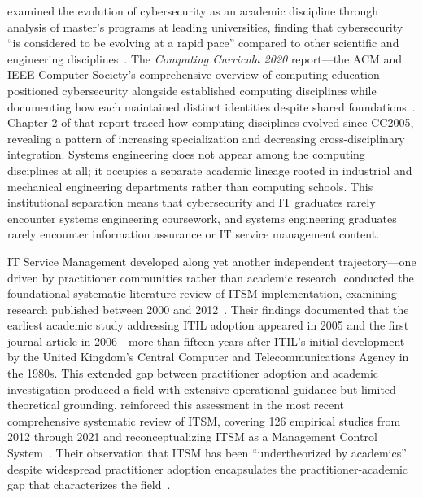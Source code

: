 \citeauthor{Cabaj_2018} examined the evolution of cybersecurity as an academic discipline through analysis of master's programs at leading universities, finding that cybersecurity ``is considered to be evolving at a rapid pace'' compared to other scientific and engineering disciplines~\parencite{Cabaj_2018}. The \textit{Computing Curricula 2020} report---the ACM and IEEE Computer Society's comprehensive overview of computing education---positioned cybersecurity alongside established computing disciplines while documenting how each maintained distinct identities despite shared foundations~\parencite{CC2020}. Chapter 2 of that report traced how computing disciplines evolved since CC2005, revealing a pattern of increasing specialization and decreasing cross-disciplinary integration. Systems engineering does not appear among the computing disciplines at all; it occupies a separate academic lineage rooted in industrial and mechanical engineering departments rather than computing schools. This institutional separation means that cybersecurity and IT graduates rarely encounter systems engineering coursework, and systems engineering graduates rarely encounter information assurance or IT service management content.

IT Service Management developed along yet another independent trajectory---one driven by practitioner communities rather than academic research. \citeauthor{Iden_2013} conducted the foundational systematic literature review of ITSM implementation, examining research published between 2000 and 2012~\parencite{Iden_2013}. Their findings documented that the earliest academic study addressing ITIL adoption appeared in 2005 and the first journal article in 2006---more than fifteen years after ITIL's initial development by the United Kingdom's Central Computer and Telecommunications Agency in the 1980s. This extended gap between practitioner adoption and academic investigation produced a field with extensive operational guidance but limited theoretical grounding. \citeauthor{MacLean_2023} reinforced this assessment in the most recent comprehensive systematic review of ITSM, covering 126 empirical studies from 2012 through 2021 and reconceptualizing ITSM as a Management Control System~\parencite{MacLean_2023}. Their observation that ITSM has been ``undertheorized by academics'' despite widespread practitioner adoption encapsulates the practitioner-academic gap that characterizes the field~\parencite{MacLean_2023}.

